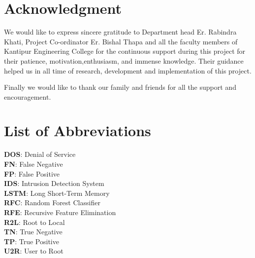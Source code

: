 \chapter*{Acknowledgment}
We would like to express sincere gratitude to Department head Er. Rabindra Khati, Project Co-ordinator Er. Bishal Thapa and all the faculty members of Kantipur Engineering College for the continuous support during this project for their patience, motivation,enthusiasm, and immense knowledge. Their guidance helped us in all time of research, development and implementation of this project.\par
Finally we would like to thank our family and friends for all the support and encouragement.\par
\begin{flushright}
\vskip -20pt
\submittedBy

\end{flushright}

{
\KECadjusttocspacings %
\makeatletter
\def\@makeschapterhead#1{%
  {\newpage \parindent \z@ \raggedright
    \normalfont
    \interlinepenalty\@M
    \center \fontsize{16pt}{1} \bfseries \MakeUppercase{#1}\par\nobreak
  }}
\makeatother 

\tableofcontents %
\listoffigures %
}
\chapter*{List of Abbreviations}
\textbf{DOS}: Denial of Service\\
\textbf{FN}: False  Negative \\
\textbf{FP}: False Positive\\
\textbf{IDS}: Intrusion Detection System\\
\textbf{LSTM}: Long Short-Term Memory\\
\textbf{RFC}: Random Forest Classifier\\
\textbf{RFE}: Recursive Feature Elimination\\
\textbf{R2L}: Root to Local \\
\textbf{TN}: True Negative\\
\textbf{TP}: True Positive\\
\textbf{U2R}: User to Root\\

